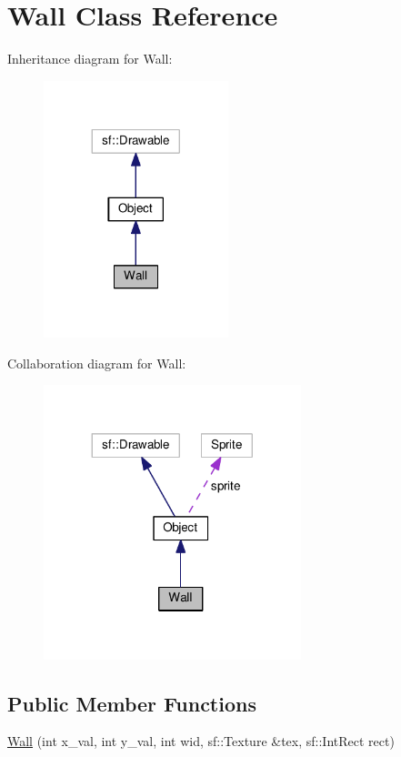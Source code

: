 \hypertarget{classWall}{\section{Wall Class Reference}
\label{classWall}
}


Inheritance diagram for Wall\+:
\nopagebreak
\begin{figure}[H]
\begin{center}
\leavevmode
\includegraphics[width=152pt]{classWall__inherit__graph}
\end{center}
\end{figure}


Collaboration diagram for Wall\+:
\nopagebreak
\begin{figure}[H]
\begin{center}
\leavevmode
\includegraphics[width=212pt]{classWall__coll__graph}
\end{center}
\end{figure}
\subsection*{Public Member Functions}
\begin{DoxyCompactItemize}
\item 
\hyperlink{classWall_af336438d603b56a880f5dd2d224c4199}{Wall} (int x\+\_\+val, int y\+\_\+val, int wid, sf\+::\+Texture \&tex, sf\+::\+Int\+Rect rect)
\end{DoxyCompactItemize}
